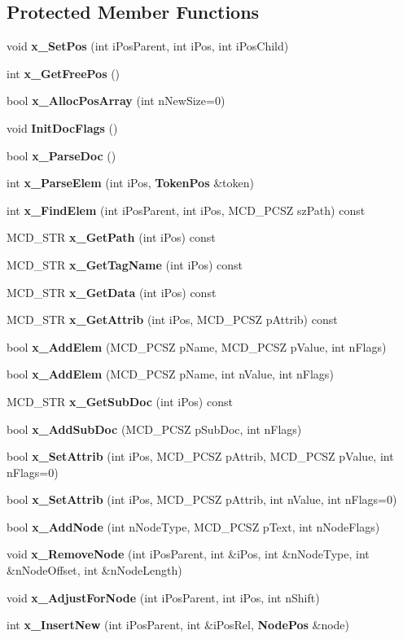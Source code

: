 \subsection*{Protected Member Functions}
\begin{CompactItemize}
\item 
void {\bf x\_\-SetPos} (int iPosParent, int iPos, int iPosChild)
\item 
int {\bf x\_\-GetFreePos} ()
\item 
bool {\bf x\_\-AllocPosArray} (int nNewSize=0)
\item 
void {\bf InitDocFlags} ()
\item 
bool {\bf x\_\-ParseDoc} ()
\item 
int {\bf x\_\-ParseElem} (int iPos, {\bf TokenPos} \&token)
\item 
int {\bf x\_\-FindElem} (int iPosParent, int iPos, MCD\_\-PCSZ szPath) const 
\item 
MCD\_\-STR {\bf x\_\-GetPath} (int iPos) const 
\item 
MCD\_\-STR {\bf x\_\-GetTagName} (int iPos) const 
\item 
MCD\_\-STR {\bf x\_\-GetData} (int iPos) const 
\item 
MCD\_\-STR {\bf x\_\-GetAttrib} (int iPos, MCD\_\-PCSZ pAttrib) const 
\item 
bool {\bf x\_\-AddElem} (MCD\_\-PCSZ pName, MCD\_\-PCSZ pValue, int nFlags)
\item 
bool {\bf x\_\-AddElem} (MCD\_\-PCSZ pName, int nValue, int nFlags)
\item 
MCD\_\-STR {\bf x\_\-GetSubDoc} (int iPos) const 
\item 
bool {\bf x\_\-AddSubDoc} (MCD\_\-PCSZ pSubDoc, int nFlags)
\item 
bool {\bf x\_\-SetAttrib} (int iPos, MCD\_\-PCSZ pAttrib, MCD\_\-PCSZ pValue, int nFlags=0)
\item 
bool {\bf x\_\-SetAttrib} (int iPos, MCD\_\-PCSZ pAttrib, int nValue, int nFlags=0)
\item 
bool {\bf x\_\-AddNode} (int nNodeType, MCD\_\-PCSZ pText, int nNodeFlags)
\item 
void {\bf x\_\-RemoveNode} (int iPosParent, int \&iPos, int \&nNodeType, int \&nNodeOffset, int \&nNodeLength)
\item 
void {\bf x\_\-AdjustForNode} (int iPosParent, int iPos, int nShift)
\item 
int {\bf x\_\-InsertNew} (int iPosParent, int \&iPosRel, {\bf NodePos} \&node)
\item 

\end{CompactItemize}
